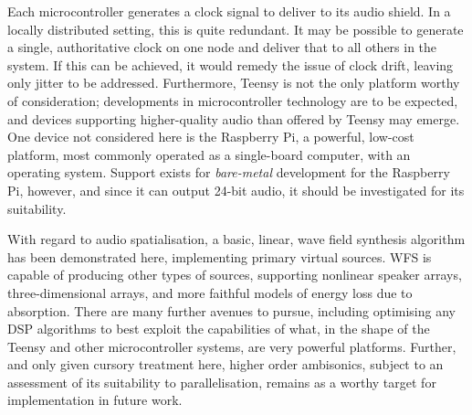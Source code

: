 Each microcontroller generates a clock signal to deliver to its audio shield.
In a locally distributed setting, this is quite redundant.
It may be possible to generate a single, authoritative clock on one node and
deliver that to all others in the system.
If this can be achieved, it would remedy the issue of clock drift, leaving only
jitter to be addressed.
Furthermore, Teensy is not the only platform worthy of consideration;
developments in microcontroller technology are to be expected, and devices
supporting higher-quality audio than offered by Teensy may emerge.
One device not considered here is the Raspberry Pi, a powerful, low-cost
platform, most commonly operated as a single-board computer, with an operating
system.
Support exists for \textit{bare-metal} development for the Raspberry Pi,
however, and since it can output 24-bit audio, it should be investigated for its
suitability.

With regard to audio spatialisation, a basic, linear, wave field synthesis
algorithm has been demonstrated here, implementing primary virtual sources.
WFS is capable of producing other types of sources, supporting nonlinear
speaker arrays, three-dimensional arrays, and more faithful models of
energy loss due to absorption.
There are many further avenues to pursue, including optimising any DSP
algorithms to best exploit the capabilities of what, in the shape of the
Teensy and other microcontroller systems, are very powerful platforms.
Further, and only given cursory treatment here, higher order ambisonics, subject
to an assessment of its suitability to parallelisation, remains as a worthy
target for implementation in future work.

